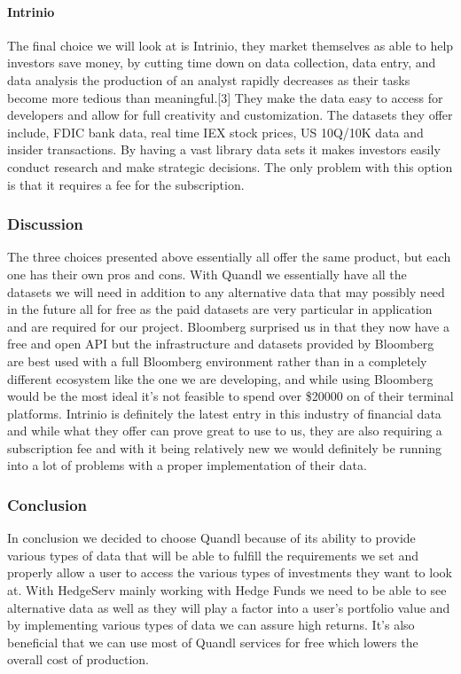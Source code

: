 \documentclass[onecolumn, draftclsnofoot,10pt, compsoc]{IEEEtran}
\begin{document}
\paragraph{Intrinio}
The final choice we will look at is Intrinio, they market themselves as able to help investors save money, by cutting time down on data collection, data entry, and data analysis the production of an analyst rapidly decreases as their tasks become more tedious than meaningful.[3] They make the data easy to access for developers and allow for full creativity and customization. The datasets they offer include, FDIC bank data, real time IEX stock prices, US 10Q/10K data and insider transactions. By having a vast library data sets it makes investors easily conduct research and make strategic decisions. The only problem with this option is that it requires a fee for the subscription. 


\subsubsection{Discussion}
The three choices presented above essentially all offer the same product, but each one has their own pros and cons. With Quandl we essentially have all the datasets we will need in addition to any alternative data that may possibly need in the future all for free as the paid datasets are very particular in application and are required for our project. Bloomberg surprised us in that they now have a free and open API but the infrastructure and datasets provided by Bloomberg are best used with a full Bloomberg environment rather than in a completely different ecosystem like the one we are developing, and while using Bloomberg would be the most ideal it's not feasible to spend over \$20000 on of their terminal platforms. Intrinio is definitely the latest entry in this industry of financial data and while what they offer can prove great to use to us, they are also requiring a subscription fee and with it being relatively new we would definitely be running into a lot of problems with a proper implementation of their data. 

\subsubsection{Conclusion}
In conclusion we decided to choose Quandl because of its ability to provide various types of data that will be able to fulfill the requirements we set and properly allow a user to access the various types of investments they want to look at. With HedgeServ mainly working with Hedge Funds we need to be able to see alternative data as well as they will play a factor into a user’s portfolio value and by implementing various types of data we can assure high returns. It's also beneficial that we can use most of Quandl services for free which lowers the overall cost of production. 
\end{document}
